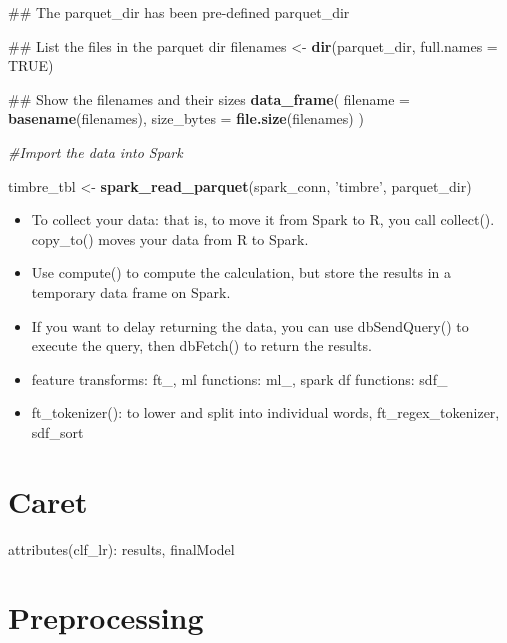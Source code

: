 \documentclass[]{book}
\newenvironment{Shaded}{\begin{snugshade}}{\end{snugshade}}
\newcommand{\KeywordTok}[1]{\textcolor[rgb]{0.13,0.29,0.53}{\textbf{#1}}}
\newcommand{\DataTypeTok}[1]{\textcolor[rgb]{0.13,0.29,0.53}{#1}}
\newcommand{\StringTok}[1]{\textcolor[rgb]{0.31,0.60,0.02}{#1}}
\newcommand{\CommentTok}[1]{\textcolor[rgb]{0.56,0.35,0.01}{\textit{#1}}}
\newcommand{\OtherTok}[1]{\textcolor[rgb]{0.56,0.35,0.01}{#1}}
\newcommand{\NormalTok}[1]{#1}
\theoremstyle{definition}
\theoremstyle{definition}
\theoremstyle{definition}
\theoremstyle{remark}
\begin{document}
\begin{Shaded}
\begin{Highlighting}[]
\NormalTok{## The parquet_dir has been pre-defined}
\NormalTok{parquet_dir}

\NormalTok{## List the files in the parquet dir}
\NormalTok{filenames <-}\StringTok{ }\KeywordTok{dir}\NormalTok{(parquet_dir, }\DataTypeTok{full.names =} \OtherTok{TRUE}\NormalTok{)}

\NormalTok{## Show the filenames and their sizes}
\KeywordTok{data_frame}\NormalTok{(}
  \DataTypeTok{filename =} \KeywordTok{basename}\NormalTok{(filenames),}
  \DataTypeTok{size_bytes =} \KeywordTok{file.size}\NormalTok{(filenames)}
\NormalTok{)}

\CommentTok{#Import the data into Spark}

\NormalTok{timbre_tbl <-}\StringTok{ }\KeywordTok{spark_read_parquet}\NormalTok{(spark_conn, }\StringTok{'timbre'}\NormalTok{, parquet_dir)}
\end{Highlighting}
\end{Shaded}

\begin{itemize}
\item
  To collect your data: that is, to move it from Spark to R, you call
  collect(). copy\_to() moves your data from R to Spark.
\item
  Use compute() to compute the calculation, but store the results in a
  temporary data frame on Spark.
\item
  If you want to delay returning the data, you can use dbSendQuery() to
  execute the query, then dbFetch() to return the results.
\item
  feature transforms: ft\_, ml functions: ml\_, spark df functions:
  sdf\_
\item
  ft\_tokenizer(): to lower and split into individual words,
  ft\_regex\_tokenizer, sdf\_sort
\end{itemize}

\section{Caret}\label{caret}

attributes(clf\_lr): results, finalModel

\section{Preprocessing}\label{preprocessing}
\end{document}

